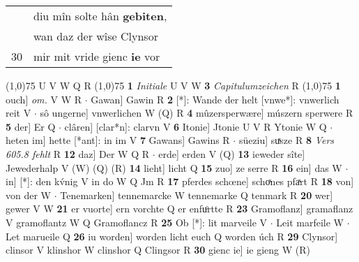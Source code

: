 \documentclass[8pt,a4paper,notitlepage]{article}
\begin{document}
\begin{table}[ht]
\begin{minipage}[t]{0.5\linewidth}
\begin{tabular}{rl}
 & diu mîn solte hân \textbf{gebiten},\\ 
 & wan daz der wîse Clynsor\\ 
30 & mir mit vride gienc \textbf{ie} vor\\ 
\end{tabular}
\scriptsize
\line(1,0){75} \newline
U V W Q R \newline
\line(1,0){75} \newline
\textbf{1} \textit{Initiale} U V W  \textbf{3} \textit{Capitulumzeichen} R  \newline
\line(1,0){75} \newline
\textbf{1} ouch] \textit{om.} V W R  $\cdot$ Gawan] Gawin R \textbf{2} [*]: Wande der helt [vnwe*]: vnwerlich reit V  $\cdot$ sô ungerne] vnwerlichen W (Q) R \textbf{4} mûzersperwære] múszern sperwere R \textbf{5} der] Er Q  $\cdot$ clâren] [clar*n]: clarvn V \textbf{6} Itonie] Jtonie U V R Ytonie W Q  $\cdot$ heten im] hette [*ant]: in im V \textbf{7} Gawans] Gawins R  $\cdot$ süeziu] suͯsze R \textbf{8} \textit{Vers 605.8 fehlt} R  \textbf{12} daz] Der W Q R  $\cdot$ erde] erden V (Q) \textbf{13} ieweder sîte] Jewederhalp V (W) (Q) (R) \textbf{14} lieht] licht Q \textbf{15} zuo] ze serre R \textbf{16} ein] das W  $\cdot$ in] [*]: den kv́nig V in do W Q Jm R \textbf{17} pferdes schœne] schoͯnes pfaͯrt R \textbf{18} von] von der W  $\cdot$ Tenemarken] tennemarcke W tennemarke Q tenmark R \textbf{20} wer] gewer V W \textbf{21} er vuorte] ern vorchte Q er enfuͦrtte R \textbf{23} Gramoflanz] gramaflanz V gramoflantz W Q Gramoflancz R \textbf{25} Ob [*]: lit marveile V  $\cdot$ Leit marfeile W  $\cdot$ Let marueile Q \textbf{26} iu worden] worden licht euch Q worden úch R \textbf{29} Clynsor] clinsor V klinshor W clinshor Q Clingsor R \textbf{30} gienc ie] ie gieng W (R) \newline
\end{minipage}
\end{table}
\end{document}
